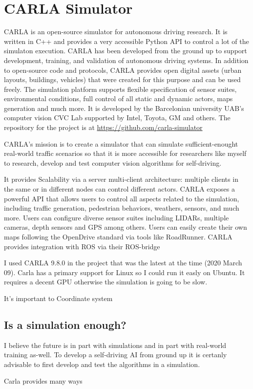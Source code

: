 \chapter{CARLA Simulator}
\label{chap:carlasim}

CARLA\cite{Dosovitskiy17} is an open-source simulator for autonomous driving
research. It is written in C++ and provides a very accessible Python API to
control a lot of the simulaton execution. CARLA has been developed from the
ground up to support development, training, and validation of autonomous driving
systems. In addition to open-source code and protocols, CARLA provides open
digital assets (urban layouts, buildings, vehicles) that were created for this
purpose and can be used freely. The simulation platform supports flexible
specification of sensor suites, environmental conditions, full control of all
static and dynamic actors, maps generation and much more. It is developed by the
Barcelonian university UAB's computer vision CVC Lab supported by Intel, Toyota,
GM and others. The repository for the project is at \url{https://github.com/carla-simulator}

CARLA's mission is to create a simulator that can simulate sufficient-enought
real-world traffic scenarios so that it is more accessible for researchers like
myself to research, develop and test computer vision algorithms for
self-driving. 

It provides Scalability via a server multi-client architecture: multiple clients
in the same or in different nodes can control different actors. CARLA exposes a
powerful API that allows users to control all aspects related to the simulation,
including traffic generation, pedestrian behaviors, weathers, sensors, and much
more. Users can configure diverse sensor suites including LIDARs, multiple
cameras, depth sensors and GPS among others. Users can easily create their own
maps following the OpenDrive standard via tools like RoadRunner. CARLA provides
integration with ROS via their ROS-bridge

I used CARLA 9.8.0 in the project that was the latest at the time (2020 March
09). Carla has a primary support for Linux so I could run it easly on Ubuntu. It
requires a decent GPU otherwise the simulation is going to be slow.

It's important to Coordinate system

\section{Is a simulation enough?}
I believe the future is in part with simulations and in part with
real-world training as-well. To develop a self-driving AI from ground up it is
certanly advisable to first develop and test the algorithms in a simulation. 

Carla provides many ways